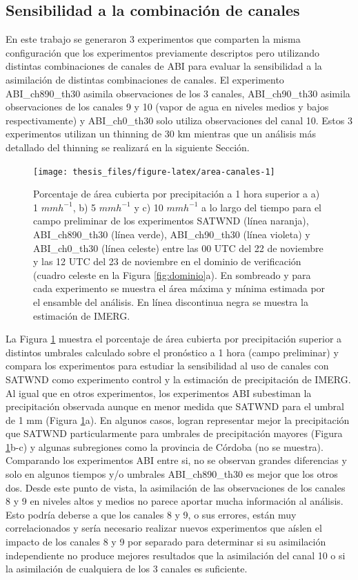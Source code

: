 \documentclass[12pt,oneside,a4paper]{reedthesis}
\begin{document}
\hypertarget{canales}{%
\subsection{Sensibilidad a la combinación de canales}\label{canales}}

En este trabajo se generaron 3 experimentos que comparten la misma configuración que los experimentos previamente descriptos pero utilizando distintas combinaciones de canales de ABI para evaluar la sensibilidad a la asimilación de distintas combinaciones de canales. El experimento ABI\_ch890\_th30 asimila observaciones de los 3 canales, ABI\_ch90\_th30 asimila observaciones de los canales 9 y 10 (vapor de agua en niveles medios y bajos respectivamente) y ABI\_ch0\_th30 solo utiliza observaciones del canal 10. Estos 3 experimentos utilizan un thinning de 30 km mientras que un análisis más detallado del thinning se realizará en la siguiente Sección.


\begin{figure}
\texttt{[image: thesis\_files/figure-latex/area-canales-1]} \caption{Porcentaje de área cubierta por precipitación a 1 hora superior a a) 1 \(mmh^{-1}\), b) 5 \(mmh^{-1}\) y c) 10 \(mmh^{-1}\) a lo largo del tiempo para el campo preliminar de los experimentos SATWND (línea naranja), ABI\_ch890\_th30 (línea verde), ABI\_ch90\_th30 (línea violeta) y ABI\_ch0\_th30 (línea celeste) entre las 00 UTC del 22 de noviembre y las 12 UTC del 23 de noviembre en el dominio de verificación (cuadro celeste en la Figura \ref{fig:dominio}a). En sombreado y para cada experimento se muestra el área máxima y mínima estimada por el ensamble del análisis. En línea discontinua negra se muestra la estimación de IMERG.}\label{fig:area-canales}
\end{figure}
La Figura \ref{fig:area-canales} muestra el porcentaje de área cubierta por precipitación superior a distintos umbrales calculado sobre el pronóstico a 1 hora (campo preliminar) y compara los experimentos para estudiar la sensibilidad al uso de canales con SATWND como experimento control y la estimación de precipitación de IMERG. Al igual que en otros experimentos, los experimentos ABI subestiman la precipitación observada aunque en menor medida que SATWND para el umbral de 1 mm (Figura \ref{fig:area-canales}a). En algunos casos, logran representar mejor la precipitación que SATWND particularmente para umbrales de precipitación mayores (Figura \ref{fig:area-canales}b-c) y algunas subregiones como la provincia de Córdoba (no se muestra). Comparando los experimentos ABI entre si, no se observan grandes diferencias y solo en algunos tiempos y/o umbrales ABI\_ch890\_th30 es mejor que los otros dos. Desde este punto de vista, la asimilación de las observaciones de los canales 8 y 9 en niveles altos y medios no parece aportar mucha información al análisis. Esto podría deberse a que los canales 8 y 9, o sus errores, están muy correlacionados y sería necesario realizar nuevos experimentos que aíslen el impacto de los canales 8 y 9 por separado para determinar si su asimilación independiente no produce mejores resultados que la asimilación del canal 10 o si la asimilación de cualquiera de los 3 canales es suficiente.
\end{document}
